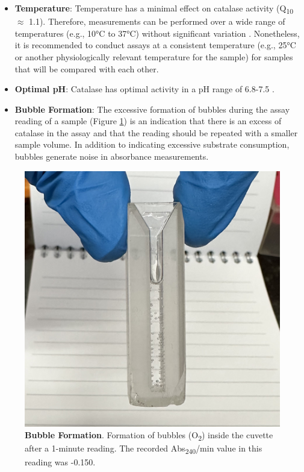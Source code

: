 \documentclass[
  9pt,
  american,
  a5paper,
  extrafontsizes,onecolumn,openright
  ]{memoir}
\newlength{\rf}
\begin{document}
\begin{itemize}
\item
  \textbf{Temperature}: Temperature has a minimal effect on catalase activity (Q\textsubscript{10} \(\approx\) 1.1). Therefore, measurements can be performed over a wide range of temperatures (e.g., 10°C to 37°C) without significant variation \autocite{aebi_catalase_1984}. Nonetheless, it is recommended to conduct assays at a consistent temperature (e.g., 25°C or another physiologically relevant temperature for the sample) for samples that will be compared with each other.
\item
  \textbf{Optimal pH}: Catalase has optimal activity in a pH range of 6.8-7.5 \autocite{aebi_catalase_1984}.
\item
  \textbf{Bubble Formation}: The excessive formation of bubbles during the assay reading of a sample (Figure \ref{fig:fig-cat-bubbles}) is an indication that there is an excess of catalase in the assay and that the reading should be repeated with a smaller sample volume. In addition to indicating excessive substrate consumption, bubbles generate noise in absorbance measurements.
\end{itemize}



\scriptsize

\begin{figure}

{\centering \includegraphics[width=0.5\linewidth]{images/catalase/bubbles} 

}

\caption{\textbf{Bubble Formation}. Formation of bubbles (O\textsubscript{2}) inside the cuvette after a 1-minute reading. The recorded Abs\textsubscript{240}/min value in this reading was -0.150.}\label{fig:fig-cat-bubbles}
\end{figure}

\normalsize
\end{document}
